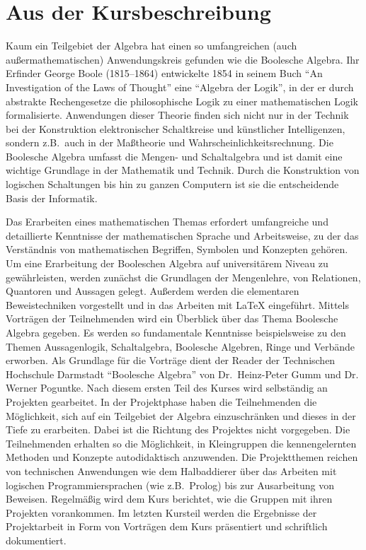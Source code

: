\documentclass{dsadokumentation}
\begin{document}

\section{Aus der Kursbeschreibung}

Kaum ein Teilgebiet der Algebra hat einen so umfangreichen (auch außermathematischen) Anwendungskreis gefunden wie die Boolesche Algebra.
Ihr Erfinder George Boole (1815--1864) entwickelte 1854 in seinem Buch \enquote{An Investigation of the Laws of Thought} eine \enquote{Algebra der Logik}, in der er durch abstrakte Rechengesetze die philosophische Logik zu einer mathematischen Logik formalisierte.
Anwendungen dieser Theorie finden sich nicht nur in der Technik bei der Konstruktion elektronischer Schaltkreise und künstlicher Intelligenzen, sondern z.B.\ auch in der Maßtheorie und Wahrscheinlichkeitsrechnung.
Die Boolesche Algebra umfasst die Mengen- und Schaltalgebra und ist damit eine wichtige Grundlage in der Mathematik und Technik.
Durch die Konstruktion von logischen Schaltungen bis hin zu ganzen Computern ist sie die entscheidende Basis der Informatik.

Das Erarbeiten eines mathematischen Themas erfordert umfangreiche und detaillierte Kenntnisse der mathematischen Sprache und Arbeitsweise, zu der das Verständnis von mathematischen Begriffen, Symbolen und Konzepten gehören.
Um eine Erarbeitung der Booleschen Algebra auf universitärem Niveau zu gewährleisten, werden zunächst die Grundlagen der Mengenlehre, von Relationen, Quantoren und Aussagen gelegt.
Außerdem werden die elementaren Beweistechniken vorgestellt und in das Arbeiten mit \LaTeX{} eingeführt.
Mittels Vorträgen der Teilnehmenden wird ein Überblick über das Thema Boolesche Algebra gegeben.
Es werden so fundamentale Kenntnisse beispielsweise zu den Themen Aussagenlogik, Schaltalgebra, Boolesche Algebren, Ringe und Verbände erworben.
Als Grundlage für die Vorträge dient der Reader der Technischen Hochschule Darmstadt \enquote{Boolesche Algebra} von Dr.\ Heinz-Peter Gumm und Dr. Werner Poguntke.
Nach diesem ersten Teil des Kurses wird selbständig an Projekten gearbeitet.
In der Projektphase haben die Teilnehmenden die Möglichkeit, sich auf ein Teilgebiet der Algebra einzuschränken und dieses in der Tiefe zu erarbeiten.
Dabei ist die Richtung des Projektes nicht vorgegeben.
Die Teilnehmenden erhalten so die Möglichkeit, in Kleingruppen die kennengelernten Methoden und Konzepte autodidaktisch anzuwenden.
Die Projektthemen reichen von technischen Anwendungen wie dem Halbaddierer über das Arbeiten mit logischen Programmiersprachen (wie z.B.\ Prolog) bis zur Ausarbeitung von Beweisen.
Regelmäßig wird dem Kurs berichtet, wie die Gruppen mit ihren Projekten vorankommen.
Im letzten Kursteil werden die Ergebnisse der Projektarbeit in Form von Vorträgen dem Kurs präsentiert und schriftlich dokumentiert.
\end{document}
